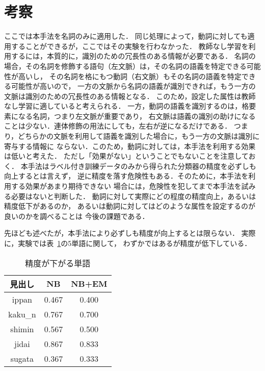 \section{考察}


ここでは本手法を名詞のみに適用した．
同じ処理によって，動詞に対しても適用することができるが，ここではその実験を行わなかった．
教師なし学習を利用するには，本質的に，識別のための冗長性のある情報が必要である．
名詞の場合，その名詞を修飾する語句（左文脈）は，その名詞の語義を特定できる可能性が高いし，
その名詞を格にもつ動詞（右文脈）もその名詞の語義を特定できる可能性が高いので，
一方の文脈から名詞の語義が識別できれば，もう一方の文脈は識別のための冗長性のある情報となる．
このため，設定した属性は教師なし学習に適していると考えられる．
一方，動詞の語義を識別するのは，格要素になる名詞，つまり左文脈が重要であり，
右文脈は語義の識別の助けになることは少ない．連体修飾の用法にしても，左右が逆になるだけである．
つまり，どちらかの文脈を利用して語義を識別した場合に，もう一方の文脈は識別に寄与する情報に
ならない．このため，動詞に対しては，本手法を利用する効果は低いと考えた\cite{shinnou-lrec02}．
ただし「効果がない」ということでもないことを注意しておく．
本手法はラベル付き訓練データのみから得られた分類器の精度を必ずしも向上するとは言えず，
逆に精度を落す危険性もある．そのために，本手法を利用する効果があまり期待できない
場合には，危険性を犯してまで本手法を試みる必要はないと判断した．
動詞に対して実際にどの程度の精度向上，あるいは精度低下があるのか，
あるいは動詞に対してはどのような属性を設定するのが良いのかを調べることは
今後の課題である．

先ほども述べたが，本手法により必ずしも精度が向上するとは限らない．
実際に，実験では\mbox{表 \ref{badword2}}の5単語に関して，
わずかではあるが精度が低下している．

\begin{table}[htbp]
  \begin{center}
    \leavevmode
    \caption{精度が下がる単語}\label{badword2}
    \begin{tabular}{|c|c|c|} \hline
見出し    &    NB       & NB+EM \\ \hline
ippan     &    0.467    &  0.400      \\ 
kaku\_n   &    0.767    &  0.700     \\ 
shimin    &    0.567    &  0.500     \\ 
jidai     &    0.867    &  0.833     \\ 
sugata    &    0.367    &  0.333     \\ \hline
    \end{tabular}
  \end{center}
\end{table}

